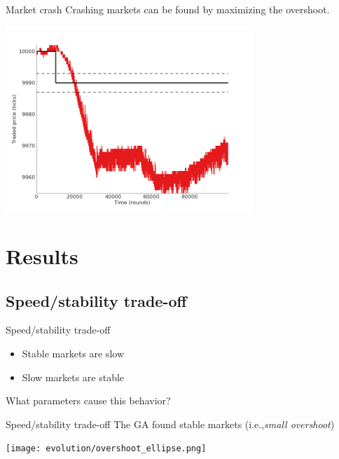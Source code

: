 \documentclass[14pt]{beamer}
\begin{document}
\begin{frame}{Market crash}
Crashing markets can be found by maximizing the overshoot.
\begin{center}
\includegraphics[width=0.7\textwidth]{market_cases/f_crash.png}
\end{center}
\end{frame}







	
\section{Results}


\begin{frame}
\tableofcontents[currentsection]
\end{frame}
\subsection{Speed/stability trade-off}

\begin{frame}{Speed/stability trade-off}
\begin{itemize}
\item Stable markets are slow
\item Slow markets are stable
\end{itemize}
What parameters cause this behavior?
\end{frame}



\begin{frame}{Speed/stability trade-off}
The GA found \color{red} stable markets \color{black} (i.e.,\textit{small overshoot})
\begin{center}
\texttt{[image: evolution/overshoot\_ellipse.png]}
\end{center}
\end{frame}
\end{document}
